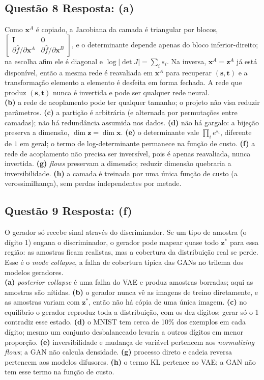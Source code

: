 \documentclass[11pt,a4paper]{article}
\begin{document}
\subsection*{Questão 8 \textemdash{} Resposta: (a)}
Como $\mathbf{x}^{A}$ é copiado, a Jacobiana da camada é triangular por blocos, $\begin{bmatrix}\mathbf{I} & \mathbf{0} \\ \partial\hat{f}/\partial\mathbf{x}^{A} & \partial\hat{f}/\partial\mathbf{x}^{B}\end{bmatrix}$, e o determinante depende apenas do bloco inferior-direito; na escolha afim ele é diagonal e $\log|\det J| = \sum_i s_i$. Na inversa, $\mathbf{x}^{A} = \mathbf{z}^{A}$ já está disponível, então a mesma rede é reavaliada em $\mathbf{x}^{A}$ para recuperar $(\mathbf{s}, \mathbf{t})$ e a transformação elemento a elemento é desfeita em forma fechada. A rede que produz $(\mathbf{s}, \mathbf{t})$ nunca é invertida e pode ser qualquer rede neural.\\
\textbf{(b)} a rede de acoplamento pode ter qualquer tamanho; o projeto não visa reduzir parâmetros.
\textbf{(c)} a partição é arbitrária (e alternada por permutações entre camadas); não há redundância assumida nos dados.
\textbf{(d)} não há gargalo: a bijeção preserva a dimensão, $\dim \mathbf{z} = \dim \mathbf{x}$.
\textbf{(e)} o determinante vale $\prod_i e^{s_i}$, diferente de $1$ em geral; o termo de log-determinante permanece na função de custo.
\textbf{(f)} a rede de acoplamento não precisa ser inversível, pois é apenas reavaliada, nunca invertida.
\textbf{(g)} \textit{flows} preservam a dimensão; reduzir dimensão quebraria a inversibilidade.
\textbf{(h)} a camada é treinada por uma única função de custo (a verossimilhança), sem perdas independentes por metade.


\subsection*{Questão 9 \textemdash{} Resposta: (f)}
O gerador só recebe sinal através do discriminador. Se um tipo de amostra (o dígito 1) engana o discriminador, o gerador pode mapear quase todo $\mathbf{z}^{*}$ para essa região: as amostras ficam realistas, mas a cobertura da distribuição real se perde. Esse é o \textit{mode collapse}, a falha de cobertura típica das GANs no trilema dos modelos geradores.\\
\textbf{(a)} \textit{posterior collapse} é uma falha do VAE e produz amostras borradas; aqui as amostras são nítidas.
\textbf{(b)} o gerador nunca vê as imagens de treino diretamente, e as amostras variam com $\mathbf{z}^{*}$, então não há cópia de uma única imagem.
\textbf{(c)} no equilíbrio o gerador reproduz toda a distribuição, com os dez dígitos; gerar só o 1 contradiz esse estado.
\textbf{(d)} o MNIST tem cerca de 10\% dos exemplos em cada dígito; mesmo um conjunto desbalanceado levaria a outros dígitos em menor proporção.
\textbf{(e)} inversibilidade e mudança de variável pertencem aos \textit{normalizing flows}; a GAN não calcula densidade.
\textbf{(g)} processo direto e cadeia reversa pertencem aos modelos difusores.
\textbf{(h)} o termo KL pertence ao VAE; a GAN não tem esse termo na função de custo.
\end{document}
